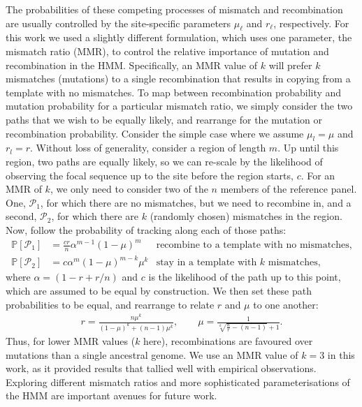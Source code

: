 \documentclass{article}
\begin{document}
The probabilities of these competing processes of mismatch and recombination are
usually controlled by the site-specific parameters $\mu_\ell$ and $r_\ell$,
respectively. For this work we used a slightly different formulation, which
uses one parameter, the mismatch ratio (MMR), to control the relative
importance of mutation and recombination in the HMM. Specifically, an MMR value
of $k$ will prefer $k$ mismatches (mutations) to a single recombination that
 results in copying from a template with no mismatches. To map between
recombination probability and mutation probability for a particular mismatch
ratio, we simply consider the two paths that we wish to be equally likely, and
rearrange for the mutation or recombination probability. Consider the simple
case where we assume $\mu_l=\mu$ and $r_l=r$. Without loss of generality,
consider a region of length $m$. Up until this region, two paths are equally
likely, so we can re-scale by the likelihood of observing the focal sequence up
to the site before the region starts, $c$. For an MMR of $k$, we only need to
consider two of the $n$ members of the reference panel.
One, $\mathcal{P}_1$,
for which there are no mismatches, but we need to recombine in, and a second,
$\mathcal{P}_2$, for which there are $k$ (randomly chosen) mismatches in the
region.
Now, follow the probability of tracking along each of those paths:
\begin{align*}
\mathbb{P}[\mathcal{P}_1] &= \frac{cr}{n}
\alpha^{m-1}\left(1-\mu\right)^m
&\text{recombine to a template with no mismatches,}\\
\mathbb{P}[\mathcal{P}_2] &= c
\alpha^{m}
\left(1-\mu\right)^{m-k}\mu^k &\text{stay in a template with $k$ mismatches,}
\end{align*}
where $\alpha = (1 - r + r / n) $ and $c$ is the
likelihood of the path up to this point, which are assumed to be
equal by construction.
We then
set these path probabilities to be equal, and rearrange to relate $r$ and $\mu$ to one another:
\begin{align*} r = \frac{n\mu^k}{\left(1-\mu\right)^k + \left(n-1\right)\mu^k},
\quad\quad \mu = \frac{1}{\sqrt[k]{\frac{n}{r} - (n-1)} + 1}. \end{align*}
Thus, for lower MMR values ($k$ here),
recombinations are favoured over mutations
than a single ancestral genome.
We use an MMR value of $k=3$ in this work,
as it provided results that tallied well with empirical observations.
Exploring different mismatch ratios and more sophisticated parameterisations
of the HMM are important avenues for future work.
\end{document}
